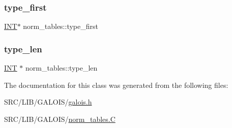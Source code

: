 \subsubsection{\texorpdfstring{type\+\_\+first}{type\_first}}
{\footnotesize\ttfamily \mbox{\hyperlink{galois_8h_a09fddde158a3a20bd2dcadb609de11dc}{I\+NT}}$\ast$ norm\+\_\+tables\+::type\+\_\+first}

\mbox{\label{classnorm__tables_a5141f3b18041bf97ddff2b48875fdae6}} 
\subsubsection{\texorpdfstring{type\+\_\+len}{type\_len}}
{\footnotesize\ttfamily \mbox{\hyperlink{galois_8h_a09fddde158a3a20bd2dcadb609de11dc}{I\+NT}} $\ast$ norm\+\_\+tables\+::type\+\_\+len}



The documentation for this class was generated from the following files\+:\begin{DoxyCompactItemize}
\item 
S\+R\+C/\+L\+I\+B/\+G\+A\+L\+O\+I\+S/\mbox{\hyperlink{galois_8h}{galois.\+h}}\item 
S\+R\+C/\+L\+I\+B/\+G\+A\+L\+O\+I\+S/\mbox{\hyperlink{norm__tables_8_c}{norm\+\_\+tables.\+C}}\end{DoxyCompactItemize}

